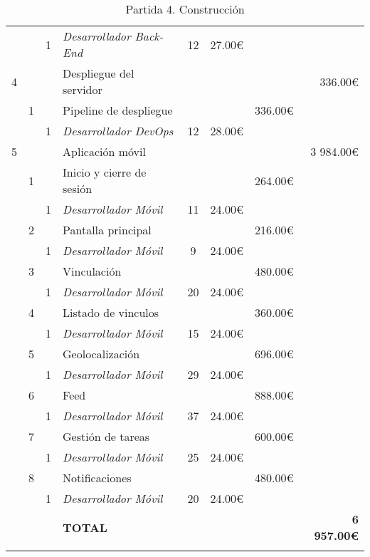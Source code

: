 \begin{longtable}{ l l l l c c r r }
    & & 1 & \emph{Desarrollador Back-End}           & 12 & 27.00€ &  & \\
    4 & & & Despliegue del servidor                  & & & & 336.00€     \\
    & 1 & & Pipeline de despliegue                  & & & 336.00€   & \\
    & & 1 & \emph{Desarrollador DevOps}             & 12 & 28.00€ &  & \\
    5 & & & Aplicación móvil                        & & & & 3 984.00€    \\
    & 1 & & Inicio y cierre de sesión               & & & 264.00€   & \\
    & & 1 & \emph{Desarrollador Móvil}              & 11 & 24.00€ &  & \\
    & 2 & & Pantalla principal                      & & & 216.00€   & \\
    & & 1 & \emph{Desarrollador Móvil}              & 9 & 24.00€ &  & \\
    & 3 & & Vinculación                             & & & 480.00€   & \\
    & & 1 & \emph{Desarrollador Móvil}              & 20 & 24.00€ &  & \\
    & 4 & & Listado de vinculos                     & & & 360.00€   & \\
    & & 1 & \emph{Desarrollador Móvil}              & 15 & 24.00€ &  & \\
    & 5 & & Geolocalización                         & & & 696.00€   & \\
    & & 1 & \emph{Desarrollador Móvil}              & 29 & 24.00€ &  & \\
    & 6 & & Feed                                    & & & 888.00€   & \\
    & & 1 & \emph{Desarrollador Móvil}              & 37 & 24.00€ &  & \\
    & 7 & & Gestión de tareas                       & & & 600.00€   & \\
    & & 1 & \emph{Desarrollador Móvil}              & 25 & 24.00€ &  & \\
    & 8 & & Notificaciones                          & & & 480.00€   & \\
    & & 1 & \emph{Desarrollador Móvil}              & 20 & 24.00€ &  & \\
    \hline
    & & & \textbf{TOTAL}                            & & & & \textbf{6 957.00€} \\
    \hline
    \caption{Partida 4. Construcción}
    \label{pre:construccion}
\end{longtable}

